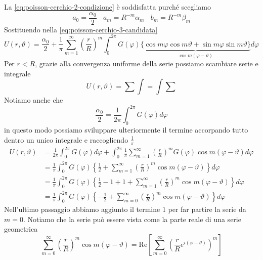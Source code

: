 \documentclass[10pt,a4paper,twoside,openright]{book}
\begin{document}
\begin{dimostrazione}
La \eqref{eq:poisson-cerchio-2-condizione} è soddisfatta purché scegliamo
\begin{equation*}
a_{0} =\frac{\alpha _{0}}{2} \ \ \ \ a_{m} =R^{-m} \alpha _{m} \ \ \ \ b_{m} =R^{-m} \beta _{m}
\end{equation*}
Sostituendo nella \eqref{eq:poisson-cerchio-3-candidata}
\begin{equation*}
U(r,\vartheta) =\frac{\alpha _{0}}{2} +\frac{1}{\pi }\sum\limits ^{\infty }_{m=1}\left(\frac{r}{R}\right)^{m}\int ^{2\pi }_{0} G(\varphi)\underbrace{\{\cos m\varphi \cos m\vartheta +\sin m\varphi \sin m\vartheta \}}_{\cos m( \varphi -\vartheta)} d\varphi 
\end{equation*}
Per $r< R$, grazie alla convergenza uniforme della serie possiamo scambiare serie e integrale
\begin{equation*}
U(r,\vartheta) =\sum \int =\int \sum 
\end{equation*}
Notiamo anche che
\begin{equation*}
\frac{\alpha _{0}}{2} =\frac{1}{2\pi }\int ^{2\pi }_{0} G(\varphi) d\varphi 
\end{equation*}
in questo modo possiamo sviluppare ulteriormente il termine accorpando tutto dentro un unico integrale e raccogliendo $\frac{1}{\pi }$
\begin{align}
U(r,\vartheta) & =\frac{1}{2\pi }\int ^{2\pi }_{0} G(\varphi) d\varphi +\int ^{2\pi }_{0}\frac{1}{\pi }\sum\limits ^{\infty }_{m=1}\left(\frac{r}{R}\right)^{m} G(\varphi)\cos m( \varphi -\vartheta) d\varphi \nonumber\\
 & =\frac{1}{\pi }\int ^{2\pi }_{0} G(\varphi)\left\{\frac{1}{2} +\sum\limits ^{\infty }_{m=1}\left(\frac{r}{R}\right)^{m}\cos m( \varphi -\vartheta)\right\} d\varphi \nonumber\\
 & =\frac{1}{\pi }\int ^{2\pi }_{0} G(\varphi)\left\{\frac{1}{2} -1+1+\sum\limits ^{\infty }_{m=1}\left(\frac{r}{R}\right)^{m}\cos m( \varphi -\vartheta)\right\} d\varphi \nonumber\\
 & =\frac{1}{\pi }\int ^{2\pi }_{0} G(\varphi)\left\{-\frac{1}{2} +\sum\limits ^{\infty }_{m=0}\left(\frac{r}{R}\right)^{m}\cos m( \varphi -\vartheta)\right\} d\varphi \label{eq:poisson-cerchio-1}
\end{align}
Nell'ultimo passaggio abbiamo aggiunto il termine $1$ per far partire la serie da $m=0$. Notiamo che la serie può essere vista come la parte reale di una serie geometrica
\begin{equation*}
\sum\limits ^{\infty }_{m=0}\left(\frac{r}{R}\right)^{m}\cos m( \varphi -\vartheta) =\mathrm{Re}\left[\sum\limits ^{\infty }_{m=0}\left(\frac{r}{R} e^{i( \varphi -\vartheta)}\right)^{m}\right]

\end{equation*}
\end{dimostrazione}
\end{document}
